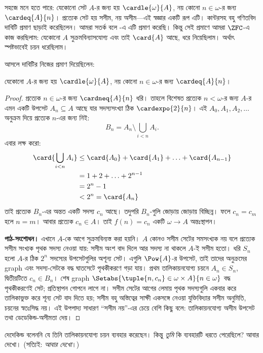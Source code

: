 \documentclass[../../../include/open-logic-section]{subfiles}
\begin{document}
\begin{ex}
সহজে মনে হতে পারে: যেকোনো সেট $A$-র জন্য
হয় $\cardle{\omega}{A}$, নয় কোনো
$n\in\omega$-র জন্য $\cardeq{A}{n}$।
প্রত্যেক সেট হয় সসীম, নয় অসীম—এই স্বজ্ঞার
একটি রূপ এটি। কান্টরসহ বহু গণিতবিদ দাবিটি
প্রমাণ ছাড়াই করেছিলেন। আমরা সতর্ক বলে
-এ
এটি প্রমাণ করেছি। কিন্তু সেই প্রমাণে আমরা $\ZFC$-এ
কাজ করছিলাম: যেকোনো $A$ সুক্রমবিন্যাসযোগ্য
এবং তাই $\card{A}$ আছে, ধরে নিয়েছিলাম।
অর্থাৎ স্পষ্টভাবেই চয়ন ধরেছিলাম।

আসলে \citet{Dedekind1888} দাবিটির নিজের
প্রমাণ দিয়েছিলেন:

\begin{thm}
যেকোনো $A$-র জন্য হয়
$\cardle{\omega}{A}$, নয় কোনো $n\in\omega$-র
জন্য $\cardeq{A}{n}$।
\end{thm}

\begin{proof}
প্রত্যেক $n\in\omega$-র জন্য
$\cardneq{A}{n}$ ধরি। তাহলে বিশেষত প্রত্যেক
$n<\omega$-র জন্য $A$-র এমন একটি উপসেট
$A_n\subseteq A$ আছে যার সদস্যসংখ্যা ঠিক
$\cardexpo{2}{n}$। এই $A_0,A_1,A_2,\ldots$
অনুক্রম দিয়ে প্রত্যেক $n$-এর জন্য নিই:
\[
	B_n = A_n \setminus \bigcup_{i < n} A_i.
\]
এবার লক্ষ করো:
\begin{align*}
	\card{\bigcup_{i < n}A_i}
	&\leq \card{A_0} + \card{A_1} + \ldots + \card{A_{n-1}}\\
	&=1 + 2 + \ldots + 2^{n-1}\\
	& = 2^n - 1\\
	& < 2^n = \card{A_n}
\end{align*}
তাই প্রত্যেক $B_n$-এর অন্তত একটি সদস্য
$c_n$ আছে। তদুপরি $B_n$-গুলি জোড়ায় জোড়ায়
বিচ্ছিন্ন। ফলে $c_n=c_m$ হলে $n=m$।
আবার প্রত্যেক $c_n\in A$। তাই $f(n)=c_n$
একটি $\omega\to A$ অন্তঃস্থাপন।
\par\noindent\textbf{পাঠ-সংশোধন।} এখানে $A$-কে আগে সুক্রমবিন্যস্ত করা হয়নি। $A$ কোনও
সসীম সেটের সমসংখ্যক নয় বলে প্রত্যেক সসীম সংখ্যক পৃথক
সদস্য নেওয়া যায়: সসীম অংশ বাদ দিলে আর সদস্য না থাকলে
$A$-ই সসীম হতো। ধরি $S_n$ হলো $A$-র ঠিক $2^n$ সদস্যের
উপসেটগুলির অশূন্য সেট। এগুলি $\Pow{A}$-র উপসেট, তাই
তাদের অনুক্রমের graph এবং সদস্য-সেটকে বদ্ধ ঘাতসেটে
পৃথকীকরণে গড়া যায়। প্রথম তালিকায়নযোগ্য চয়নে
$A_n\in S_n$, দ্বিতীয়টিতে $c_n\in B_n$।
শেষ graph $\Setabs{\tuple{n,c_n}\in\omega\times A}{n\in\omega}$
বদ্ধ পৃথকীকরণেই সেট; প্রতিস্থাপন গোপনে লাগে না।
সসীম সেটের আগের লেমায় পৃথক সদস্যগুলি একবার করে তালিকাভুক্ত
করে শূন্য সেট বাদ দিতে হয়; সসীম বহু অস্তিত্বের সাক্ষী একসঙ্গে
নেওয়া যুক্তিবিদ্যার সসীম অনুমিতি, চয়নের স্বতঃসিদ্ধ নয়।
এই উপপাদ্য সাধারণ ``সসীম নয়''-এর চেয়ে বেশি কিছু বলে:
তালিকায়নযোগ্য অসীম উপসেট তথা ডেডেকিন্ড-অসীমতা দেয়।
\end{proof}
\noindent
দেদেকিন্ড বলেননি যে তিনি তালিকায়নযোগ্য চয়ন
ব্যবহার করেছেন। কিন্তু \emph{তুমি} কি ব্যবহারটি
ধরতে পেরেছিলে? আবার দেখো। (সত্যিই:
\emph{আবার দেখো}।)


\end{ex}
\end{document}
